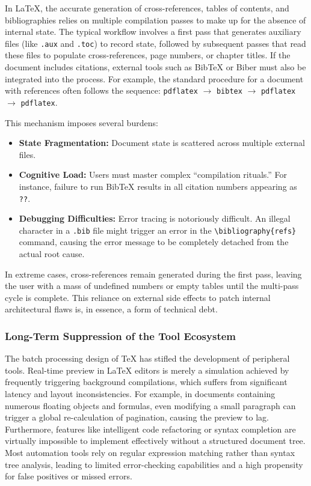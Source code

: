 In \LaTeX{}, the accurate generation of cross-references, tables of contents, and bibliographies relies on multiple compilation passes to make up for the absence of internal state. The typical workflow involves a first pass that generates auxiliary files (like \texttt{.aux} and \texttt{.toc}) to record state, followed by subsequent passes that read these files to populate cross-references, page numbers, or chapter titles. If the document includes citations, external tools such as BibTeX or Biber must also be integrated into the process. For example, the standard procedure for a document with references often follows the sequence: \texttt{pdflatex} $\rightarrow$ \texttt{bibtex} $\rightarrow$ \texttt{pdflatex} $\rightarrow$ \texttt{pdflatex}.

This mechanism imposes several burdens:

\begin{itemize}
  \item \textbf{State Fragmentation:} Document state is scattered across multiple external files.
  \item \textbf{Cognitive Load:} Users must master complex ``compilation rituals.'' For instance, failure to run BibTeX results in all citation numbers appearing as \texttt{??}.
  \item \textbf{Debugging Difficulties:} Error tracing is notoriously difficult. An illegal character in a \texttt{.bib} file might trigger an error in the \texttt{\textbackslash bibliography\{refs\}} command, causing the error message to be completely detached from the actual root cause.
\end{itemize}

In extreme cases, cross-references remain generated during the first pass, leaving the user with a mass of undefined numbers or empty tables until the multi-pass cycle is complete. This reliance on external side effects to patch internal architectural flaws is, in essence, a form of technical debt.

\subsubsection{Long-Term Suppression of the Tool Ecosystem}

The batch processing design of \TeX{} has stifled the development of peripheral tools. Real-time preview in \LaTeX{} editors is merely a simulation achieved by frequently triggering background compilations, which suffers from significant latency and layout inconsistencies. For example, in documents containing numerous floating objects and formulas, even modifying a small paragraph can trigger a global re-calculation of pagination, causing the preview to lag. Furthermore, features like intelligent code refactoring or syntax completion are virtually impossible to implement effectively without a structured document tree. Most automation tools rely on regular expression matching rather than syntax tree analysis, leading to limited error-checking capabilities and a high propensity for false positives or missed errors.


